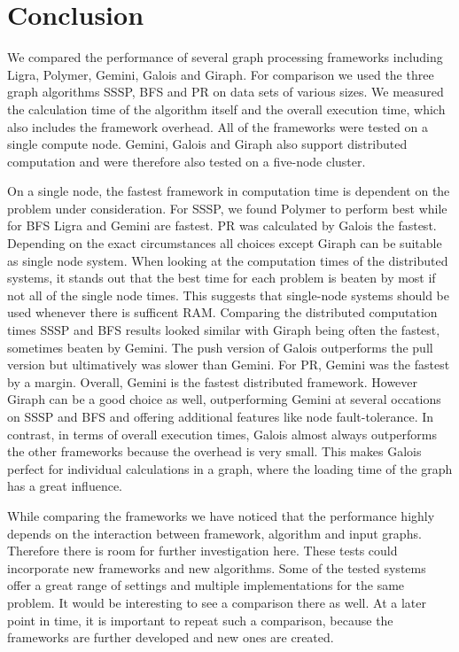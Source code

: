 
\section{Conclusion}

We compared the performance of several graph processing frameworks including Ligra, Polymer, Gemini, Galois and Giraph. 
For comparison we used the three graph algorithms SSSP, BFS and PR on data sets of various sizes.
We measured the calculation time of the algorithm itself and the overall execution time, which also includes the framework overhead.
All of the frameworks were tested on a single compute node. Gemini, Galois and Giraph also support distributed computation and were therefore also tested on a five-node cluster.

On a single node, the fastest framework in computation time is dependent on the problem under consideration.
For SSSP, we found Polymer to perform best while for BFS Ligra and Gemini are fastest. PR was calculated by Galois the fastest.
Depending on the exact circumstances all choices except Giraph can be suitable as single node system. 
When looking at the computation times of the distributed systems, it stands out that the best time for each problem is beaten by most if not all of the single node times.
This suggests that single-node systems should be used whenever there is sufficent RAM.
Comparing the distributed computation times SSSP and BFS results looked similar with Giraph being often the fastest, sometimes beaten by Gemini. The push version of Galois outperforms the pull version but ultimatively was slower than Gemini. For PR, Gemini was the fastest by a margin.
Overall, Gemini is the fastest distributed framework. However Giraph can be a good choice as well, outperforming Gemini at several occations on SSSP and BFS and offering additional features like node fault-tolerance.
In contrast, in terms of overall execution times, Galois almost always outperforms the other frameworks because the overhead is very small.
This makes Galois perfect for individual calculations in a graph, where the loading time of the graph has a great influence.


While comparing the frameworks we have noticed that the performance highly depends on the interaction between framework, algorithm and input graphs.
Therefore there is room for further investigation here. These tests could incorporate new frameworks and new algorithms.
Some of the tested systems offer a great range of settings and multiple implementations for the same problem. It would be interesting to see a comparison there as well.
At a later point in time, it is important to repeat such a comparison, because the frameworks are further developed and new ones are created.
